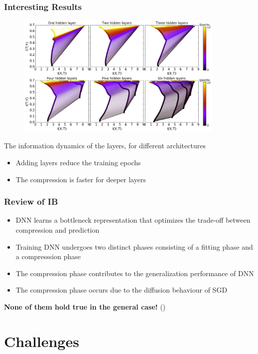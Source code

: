 \documentclass{beamer}
\begin{document}
\begin{frame}
    \frametitle{Interesting Results}
    \vspace{-0.25cm}
    \begin{figure}
        \centering
        \includegraphics[width=10cm]{info_plane_layers.jpg}
    \end{figure}
    \vspace{-0.4cm}
    The information dynamics of the layers, for different architectures
    \begin{itemize}
        \item Adding layers reduce the training epochs
        \item The compression is faster for deeper layers
    \end{itemize}
\end{frame}

\begin{frame}
    \frametitle{Review of IB}
    \begin{itemize}
        \item DNN learns a bottleneck representation that optimizes the trade-off between compression and prediction
        \item Training DNN undergoes two distinct phases consisting of a fitting phase and a compresssion phase
        \item The compression phase contributes to the generalization performance of DNN
        \item The compression phase occurs due to the diffusion behaviour of SGD
    \end{itemize}
    \vspace{1cm}
    \centering
    \pause \textbf{None of them hold true in the general case!} (\cite{IB-challenge})

\end{frame}

\section{Challenges}
\end{document}
